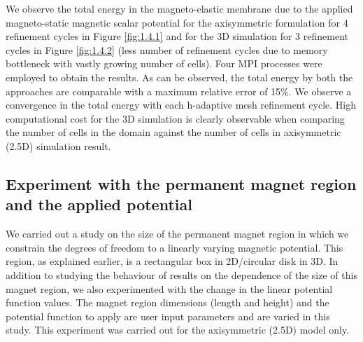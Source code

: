 We observe the total energy in the magneto-elastic membrane due to the applied magneto-static magnetic scalar potential for the axisymmetric formulation for 4 refinement cycles in Figure \eqref{fig:1.4.1} and for the 3D simulation for 3 refinement cycles in Figure \eqref{fig:1.4.2} (less number of refinement cycles due to memory bottleneck with vastly growing number of cells). Four MPI processes were employed to obtain the results. As can be observed, the total energy by both the approaches are comparable with a maximum relative error of 15\%. We observe a convergence in the total energy with each h-adaptive mesh refinement cycle. High computational cost for the 3D simulation is clearly observable when comparing the number of cells in the domain against the number of cells in axisymmetric (2.5D) simulation result. \par 

\subsection{Experiment with the permanent magnet region and the applied potential}
We carried out a study on the size of the permanent magnet region in which we constrain the degrees of freedom to a linearly varying magnetic potential. This region, as explained earlier, is a rectangular box in 2D/circular disk in 3D. In addition to studying the behaviour of results on the dependence of the size of this magnet region, we also experimented with the change in the linear potential function values. The magnet region dimensions (length and height) and the potential function to apply are user input parameters and are varied in this study. This experiment was carried out for the axisymmetric (2.5D) model only.\par 


